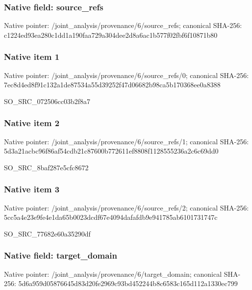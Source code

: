 \documentclass[10pt,a4paper]{article}
\begin{document}
\subsubsection{Native field: source\_\allowbreak{}refs}
Native pointer: /joint\_\allowbreak{}analysis/provenance/6/source\_\allowbreak{}refs; canonical SHA-256: c1224ed93ea280c1dd1a190faa729a304dee2d8a6ac1b577f02fbf6f10871b80

\subsubsection{Native item 1}
Native pointer: /joint\_\allowbreak{}analysis/provenance/6/source\_\allowbreak{}refs/0; canonical SHA-256: 7ec8d4ed8f91c132a1de87534a55d39252f47d06682b98ca5b170368ee0a8388

\begingroup\raggedright\sloppy SO\_\allowbreak{}SRC\_\allowbreak{}072506cc03b2f8a7\par\endgroup

\subsubsection{Native item 2}
Native pointer: /joint\_\allowbreak{}analysis/provenance/6/source\_\allowbreak{}refs/1; canonical SHA-256: 5d3a21acbc96f86af54cdb21c87600b772611ef8808f1128555236a2c6c69dd0

\begingroup\raggedright\sloppy SO\_\allowbreak{}SRC\_\allowbreak{}8baf287e5cfc8672\par\endgroup

\subsubsection{Native item 3}
Native pointer: /joint\_\allowbreak{}analysis/provenance/6/source\_\allowbreak{}refs/2; canonical SHA-256: 5cc5a4e23e9fe4e1da65b0023dcdf67e4094dafafdb9e941785ab6101731747c

\begingroup\raggedright\sloppy SO\_\allowbreak{}SRC\_\allowbreak{}77682e60a35290df\par\endgroup

\subsubsection{Native field: target\_\allowbreak{}domain}
Native pointer: /joint\_\allowbreak{}analysis/provenance/6/target\_\allowbreak{}domain; canonical SHA-256: 5d6a959d05876645d83d20fe2969c93bd452244b8c6583c165d112a1330ec799
\end{document}
